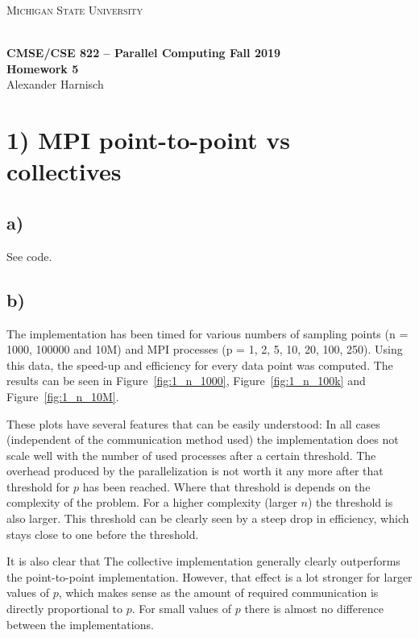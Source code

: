 \documentclass[a4paper, 11pt]{article}
\begin{document}
\noindent
\centerline{\small{\textsc{Michigan State University}}} \\
\large{\textbf{CMSE/CSE 822 – Parallel Computing \hfill Fall 2019 \\
Homework 5}} \\
Alexander Harnisch \\
\noindent\makebox[\linewidth]{\rule{\textwidth}{0.4pt}}

\section*{1) MPI point-to-point vs collectives}
\subsection*{a)}
See code.

\FloatBarrier
\subsection*{b)}
The implementation has been timed for various numbers of sampling points (n =
1000, 100000 and 10M) and MPI processes (p = 1, 2, 5, 10, 20, 100, 250). Using
this data, the speed-up and efficiency for every data point was computed. The
results can be seen in Figure~\ref{fig:1_n_1000}, Figure~\ref{fig:1_n_100k} and
Figure~\ref{fig:1_n_10M}.

These plots have several features that can be easily understood: In all cases
(independent of the communication method used) the implementation does not
scale well with the number of used processes after a certain threshold. The
overhead produced by the parallelization is not worth it any more after that
threshold for $p$ has been reached. Where that threshold is depends on the
complexity of the problem.  For a higher complexity (larger $n$) the threshold
is also larger. This threshold can be clearly seen by a steep drop in
efficiency, which stays close to one before the threshold. 

It is also clear that The collective implementation generally clearly
outperforms the point-to-point implementation. However, that effect is a lot
stronger for larger values of $p$, which makes sense as the amount of required
communication is directly proportional to $p$. For small values of $p$ there is
almost no difference between the implementations.
\end{document}
